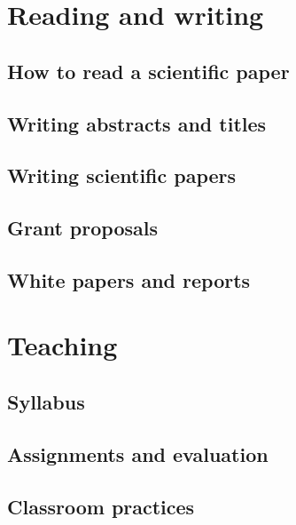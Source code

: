 \documentclass[12pt,letterpaper]{book}
\begin{document}
\part{Reading and writing}%

\chapter{How to read a scientific paper}

\chapter{Writing abstracts and titles}

\chapter{Writing scientific papers}

\chapter{Grant proposals}


\chapter{White papers and reports}

\part{Teaching}

\chapter{Syllabus}

\chapter{Assignments and evaluation}

\chapter{Classroom practices}
\end{document}
